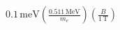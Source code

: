 \documentclass[12pt,notitlepage]{article}
\begin{document}
\begin{align*}
  0.1  \,\mathrm{meV}
  \left( \frac{0.511\,\mathrm{MeV}}{m_e} \right)
  \left( \frac{B}{1\,\mathrm{T}} \right)
\end{align*}
\end{document}
